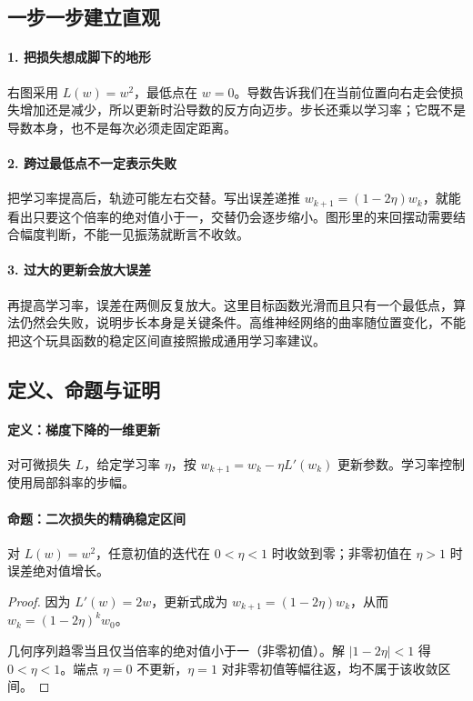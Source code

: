 \subsection*{一步一步建立直观}

\paragraph{1. 把损失想成脚下的地形}

右图采用 $L(w)=w^2$，最低点在 $w=0$。导数告诉我们在当前位置向右走会使损失增加还是减少，所以更新时沿导数的反方向迈步。步长还乘以学习率；它既不是导数本身，也不是每次必须走固定距离。



\paragraph{2. 跨过最低点不一定表示失败}

把学习率提高后，轨迹可能左右交替。写出误差递推 $w_{k+1}=(1-2\eta)w_k$，就能看出只要这个倍率的绝对值小于一，交替仍会逐步缩小。图形里的来回摆动需要结合幅度判断，不能一见振荡就断言不收敛。



\paragraph{3. 过大的更新会放大误差}

再提高学习率，误差在两侧反复放大。这里目标函数光滑而且只有一个最低点，算法仍然会失败，说明步长本身是关键条件。高维神经网络的曲率随位置变化，不能把这个玩具函数的稳定区间直接照搬成通用学习率建议。



\subsection*{定义、命题与证明}

\paragraph{定义：梯度下降的一维更新}

对可微损失 $L$，给定学习率 $\eta$，按 $w_{k+1}=w_k-\eta L'(w_k)$ 更新参数。学习率控制使用局部斜率的步幅。

\paragraph{命题：二次损失的精确稳定区间}

对 $L(w)=w^2$，任意初值的迭代在 $0<\eta<1$ 时收敛到零；非零初值在 $\eta>1$ 时误差绝对值增长。

\begin{proof}

因为 $L'(w)=2w$，更新式成为 $w_{k+1}=(1-2\eta)w_k$，从而 $w_k=(1-2\eta)^kw_0$。

几何序列趋零当且仅当倍率的绝对值小于一（非零初值）。解 $|1-2\eta|<1$ 得 $0<\eta<1$。端点 $\eta=0$ 不更新，$\eta=1$ 对非零初值等幅往返，均不属于该收敛区间。

\end{proof}
